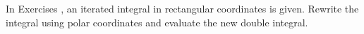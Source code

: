 {\noindent In Exercises}
{, an iterated integral in rectangular coordinates is given. Rewrite the integral using polar coordinates and evaluate the new double integral.}
